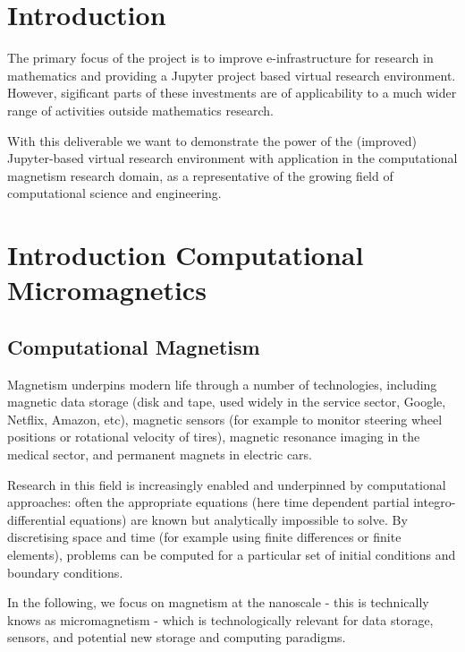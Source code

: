 \documentclass{deliverablereport}
\author{Marijan Beg and Hans Fangohr}
\begin{document}
\maketitle
\githubissuedescription
\newpage
\tableofcontents
\newpage

\section{Introduction}
The primary focus of the \ODK project is to improve
e-infrastructure for research in mathematics and providing a Jupyter
project based virtual research environment. However, sigificant parts
of these investments are of applicability to a much wider range of
activities outside mathematics research.

With this deliverable we want to demonstrate the power of the
(improved) Jupyter-based virtual research environment with application
in the computational magnetism research domain, as a representative of
the growing field of computational science and engineering.

\section{Introduction Computational Micromagnetics}
\subsection{Computational Magnetism}

Magnetism underpins modern life through a number of technologies,
including magnetic data storage (disk and tape, used widely in the
service sector, Google, Netflix, Amazon, etc), magnetic sensors (for
example to monitor steering wheel positions or rotational velocity of
tires), magnetic resonance imaging in the medical sector, and
permanent magnets in electric cars.

Research in this field is increasingly enabled and underpinned by
computational approaches: often the appropriate equations (here time
dependent partial integro-differential equations) are known but
analytically impossible to solve. By discretising space and time (for
example using finite differences or finite elements), problems can be
computed for a particular set of initial conditions and boundary
conditions.

In the following, we focus on magnetism at the nanoscale -
this is technically knows as micromagnetism - which is technologically
relevant for data storage, sensors, and potential new storage and
computing paradigms.
\end{document}
